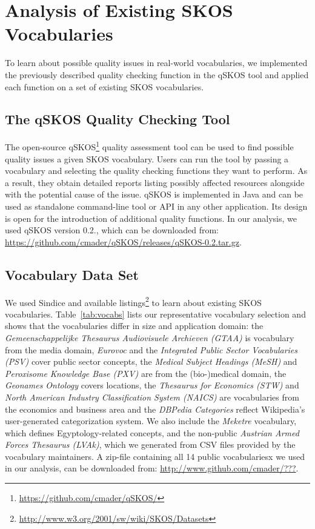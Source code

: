 
\section{Analysis of Existing SKOS Vocabularies}\label{sec:analysis}

To learn about possible quality issues in real-world vocabularies, we implemented the previously described quality checking function in the qSKOS tool and applied each function on a set of existing SKOS vocabularies. 

\subsection{The qSKOS Quality Checking Tool}

The open-source qSKOS\footnote{\url{https://github.com/cmader/qSKOS/}} quality assessment tool can be used to find possible quality issues a given SKOS vocabulary. Users can run the tool by passing a vocabulary and selecting the quality checking functions they want to perform. As a result, they obtain detailed reports listing possibly affected resources alongside with the potential cause of the issue. qSKOS is implemented in Java and can be used as standalone command-line tool or API in any other application. Its design is open for the introduction of additional quality functions. In our analysis, we used qSKOS version 0.2., which can be downloaded from: \url{https://github.com/cmader/qSKOS/releases/qSKOS-0.2.tar.gz}.

\subsection{Vocabulary Data Set}

We used Sindice and available listings\footnote{\url{http://www.w3.org/2001/sw/wiki/SKOS/Datasets}} to learn about existing SKOS vocabularies. Table~\ref{tab:vocabs} lists our representative vocabulary selection  and shows that the vocabularies differ in size and application domain: the \emph{Gemeenschappelijke Thesaurus Audiovisuele Archieven (GTAA)} is vocabulary from the media domain, \emph{Eurovoc} and the \emph{Integrated Public Sector Vocabularies (PSV)} cover public sector concepts, the \emph{Medical Subject Headings (MeSH)} and \emph{Peroxisome Knowledge Base (PXV)} are from the (bio-)medical domain, the \emph{Geonames Ontology} covers locations, the \emph{Thesaurus for Economics (STW)} and \emph{North American Industry Classification System (NAICS)} are vocabularies from the economics and business area and the \emph{DBPedia Categories} reflect Wikipedia's user-generated categorization system. We also include the \emph{Meketre} vocabulary, which defines Egyptology-related concepts, and the non-public \emph{Austrian Armed Forces Thesaurus (LVAk)}, which we generated from CSV files provided by the vocabulary maintainers. A zip-file containing all 14 public vocabulariesx we used in our analysis, can be downloaded from: \url{http://www.github.com/cmader/???}.

